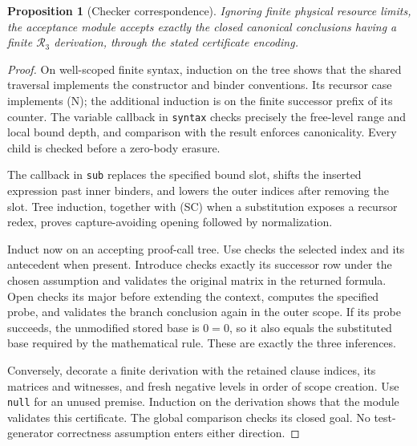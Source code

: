 \documentclass[11pt]{article}
\newtheorem{proposition}[theorem]{Proposition}
\theoremstyle{definition}
\theoremstyle{remark}
\newcommand{\K}{\mathcal R_3}
\begin{document}
\begin{proposition}[Checker correspondence]
Ignoring finite physical resource limits, the acceptance
module accepts exactly the closed canonical conclusions
having a finite $\K$ derivation, through the stated
certificate encoding.
\end{proposition}
\begin{proof}
On well-scoped finite syntax, induction on the tree
shows that the shared traversal implements the
constructor and binder conventions. Its recursor
case implements (N); the additional induction is
on the finite successor prefix of its counter.
The variable callback in \texttt{syntax} checks
precisely the free-level range and local bound
depth, and comparison with the result enforces
canonicality. Every child is checked before a
zero-body erasure.

The callback in \texttt{sub} replaces the
specified bound slot, shifts the inserted
expression past inner binders, and lowers
the outer indices after removing the slot.
Tree induction, together with (SC) when a
substitution exposes a recursor redex,
proves capture-avoiding opening followed
by normalization.

Induct now on an accepting proof-call tree.
Use checks the selected index and its
antecedent when present. Introduce checks
exactly its successor row under the chosen
assumption and validates the original matrix
in the returned formula. Open checks its
major before extending the context, computes
the specified probe, and validates the branch
conclusion again in the outer scope. If its
probe succeeds, the unmodified stored base
is $0=0$, so it also equals the substituted
base required by the mathematical rule.
These are exactly the three inferences.

Conversely, decorate a finite derivation
with the retained clause indices, its
matrices and witnesses, and fresh negative
levels in order of scope creation.
Use \texttt{null} for an unused premise.
Induction on the derivation shows that
the module validates this certificate.
The global comparison checks its closed
goal. No test-generator correctness
assumption enters either direction.
\end{proof}
\end{document}
